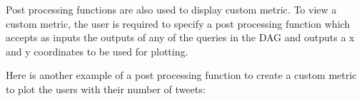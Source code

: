 \documentclass[letterpaper,10pt,english]{sphinxmanual}
\begin{document}
%
\begin{sphinxVerbatim}[commandchars=\\\{\}]
 
      \PYG{p}{[}\PYG{p}{]}
      \PYG{p}{[}\PYG{p}{]}
       
            

      
    \PYG{p}{[}\PYG{p}{]}  
     
\end{sphinxVerbatim}

Post processing functions are also used to display custom metric. To view a custom metric, the user is required to specify a post processing function which accepts as inputs the outputs of any of the queries in the DAG and outputs a x and y coordinates to be used for plotting.

Here is another example of a post processing function to create a custom metric to plot the users with their number of tweets:
\end{document}
